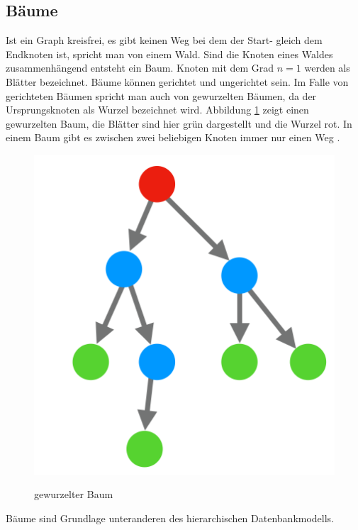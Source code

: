 \subsection{Bäume}
Ist ein Graph kreisfrei, es gibt keinen Weg bei dem der Start- gleich dem Endknoten ist, spricht man von einem Wald.
Sind die Knoten eines Waldes zusammenhängend entsteht ein Baum.
Knoten mit dem Grad $n=1$ werden als Blätter bezeichnet.
Bäume können gerichtet und ungerichtet sein.
Im Falle von gerichteten Bäumen spricht man auch von gewurzelten Bäumen, da der Ursprungsknoten als Wurzel bezeichnet wird.
Abbildung \ref{fig:baum} zeigt einen gewurzelten Baum, die Blätter sind hier grün dargestellt und die Wurzel rot.
In einem Baum gibt es zwischen zwei beliebigen Knoten immer nur einen Weg \cite{basicgraphtheory}.
\begin{figure}[H]
	\begin{center}
	\includegraphics[scale = 0.3]{./images/baum.png}
	\label{fig:baum}
    \caption{gewurzelter Baum}
	\end{center}
\end{figure}
Bäume sind Grundlage unteranderen des hierarchischen Datenbankmodells.
